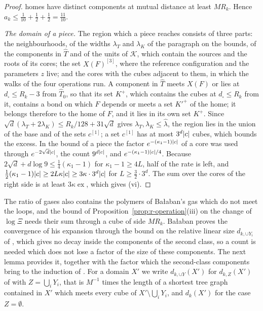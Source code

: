 \documentclass[11pt]{preprint}
\DeclarePairedDelimiter{\abs}{\lvert}{\rvert}
\numberwithin{equation}{section}
\theoremstyle{definition}
\theoremstyle{remark}
\theoremstyle{plain}
\begin{document}
\begin{proof}
homes have distinct components at mutual distance at least $MR_k$. Hence $a_k \leq \frac1{10} + \frac12 + \frac12 = \frac{11}{10}$.

\emph{The domain of a piece.} The region which a piece reaches consists of three parts: the neighbourhoods, of the widths $\lambda_T$ and $\lambda_K$ of the paragraph on the bounds, of the components in $\hat T$ and of the units of $\mathcal K$, which contain the sources and the roots of its cores; the set $X(F)^{[3]}$, where the reference configuration and the parameters $z$ live; and the cores with the cubes adjacent to them, in which the walks of the four operations run. A component in $\hat T$ meets $X(F)$ or lies at $d_\square \leq R_k - 3$ from $\hat T_0$, so that its set $K^+$, which contains the cubes at $d_\square \leq R_k$ from it, contains a bond on which $F$ depends or meets a set $K'^+$ of the home; it belongs therefore to the home of $F$, and it lies in its own set $K^+$. Since $\sqrt d(\lambda_T + 2\lambda_K) \leq R_k/128 + 31\sqrt d$ gives $\lambda_T, \lambda_K \leq \hat\lambda$, the region lies in the union of the base and of the sets $c^{[1]}$; a set $c^{[1]}$ has at most $3^d\abs c$ cubes, which bounds the excess. In the bound of a piece the factor $e^{-(\kappa_1-1)\abs c}$ of a core was used through $e^{-2\sqrt d\abs c}$, the count $9^{d\abs c}$, and $e^{-(\kappa_1-1)\abs c/4}$. Because $2\sqrt d + d\log 9 \leq \frac14(\kappa_1 - 1)$ for $\kappa_1 - 1 \geq 4L$, half of the rate is left, and $\frac12(\kappa_1 - 1)\abs c \geq 2L\kappa\abs c \geq 3\kappa \cdot 3^d\abs c$ for $L \geq \frac32 \cdot 3^d$. The sum over the cores of the right side is at least $3\kappa\operatorname{ex}$, which gives (vi).
\end{proof}

The ratio of gases also contains the polymers of Ba{\l}aban's gas which do not meet the loops, and the bound of Proposition~\ref{prop:r-operation}(iii) on the change of $\log\Xi$ needs their sum through a cube of side $MR_k$. Ba{\l}aban proves the convergence of his expansion through the bound \cite[(1.97), p.~389]{BalabanLFR2} on the relative linear size $d_{k,\cup Y_i}$ of \cite[(1.67), p.~376]{BalabanLFR2}, which gives no decay inside the components of the second class, so a count is needed which does not lose a factor of the size of these components. The next lemma provides it, together with the factor which the second-class components bring to the induction of \cite[(1.80)]{BalabanLFR2}. For a domain $X'$ we write $d_{k,\cup Y}(X')$ for $d_{k,Z}(X')$ of \cite[(1.67)]{BalabanLFR2} with $Z = \bigcup_iY_i$, that is $M^{-1}$ times the length of a shortest tree graph contained in $X'$ which meets every cube of $X' \setminus \bigcup_iY_i$, and $d_k(X')$ for the case $Z = \emptyset$.
\end{document}
